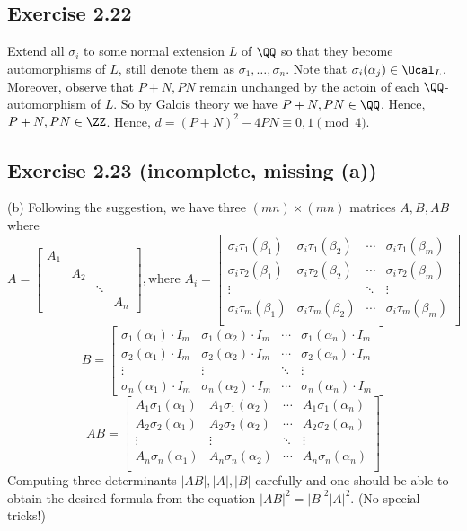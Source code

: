 \documentclass[../Chapter.tex]{subfiles}
\begin{document}
\subsection*{Exercise 2.22}

Extend all $\sigma_i$ to some normal extension $L$ of $\QQ$ so that they become automorphisms of $L$, still denote them as $\sigma_1,\ldots,\sigma_n$. Note that $\sigma_i(\alpha_j)\in \Ocal_L$. Moreover, observe that $P+N,PN$ remain unchanged by the actoin of each $\QQ$-automorphism of $L$. So by Galois theory we have $P+N,PN\in\QQ$. Hence, $P+N,PN\in\ZZ$. Hence, $d=(P+N)^2-4PN \equiv 0,1 \pmod{4}$.

\subsection*{Exercise 2.23 \color{red}(incomplete, missing (a))}

(b) Following the suggestion, we have three $(mn)\times(mn)$ matrices $A,B,AB$ where
$$A=\begin{bmatrix}
A_1 &         &             &               \\
       & A_2 &             &               \\
       &         & \ddots &               \\
       &         &             & A_{n}
\end{bmatrix}, \text{where }
A_i=\begin{bmatrix}
\sigma_i\tau_1(\beta_1) & \sigma_i\tau_1(\beta_2) & \cdots & \sigma_i\tau_1(\beta_m)  \\
\sigma_i\tau_2(\beta_1) & \sigma_i\tau_2(\beta_2) & \cdots & \sigma_i\tau_2(\beta_m) \\
\vdots &     & \ddots & \vdots       \\
\sigma_i\tau_m(\beta_1) & \sigma_i\tau_m(\beta_2) & \cdots & \sigma_i\tau_m(\beta_m) \\
\end{bmatrix}
$$
$$B=\begin{bmatrix}
\sigma_1(\alpha_1)\cdot I_m & \sigma_1(\alpha_2)\cdot I_m & \cdots & \sigma_1(\alpha_n)\cdot I_m  \\
\sigma_2(\alpha_1)\cdot I_m & \sigma_2(\alpha_2)\cdot I_m & \cdots & \sigma_2(\alpha_n)\cdot I_m  \\
\vdots & \vdots & \ddots & \vdots \\
\sigma_n(\alpha_1)\cdot I_m & \sigma_n(\alpha_2)\cdot I_m & \cdots & \sigma_n(\alpha_n)\cdot I_m
\end{bmatrix}
$$
$$AB=\begin{bmatrix}
A_1\sigma_1(\alpha_1) & A_1\sigma_1(\alpha_2) & \cdots & A_1\sigma_1(\alpha_n)  \\
A_2\sigma_2(\alpha_1) & A_2\sigma_2(\alpha_2) & \cdots & A_2\sigma_2(\alpha_n)  \\
\vdots & \vdots & \ddots & \vdots  \\
A_n\sigma_n(\alpha_1) & A_n\sigma_n(\alpha_2) & \cdots & A_n\sigma_n(\alpha_n)  \\
\end{bmatrix}
$$
Computing three determinants $|AB|,|A|,|B|$ carefully and one should be able to obtain the desired formula from the equation $|AB|^2=|B|^2|A|^2$. (No special tricks!)
\end{document}
